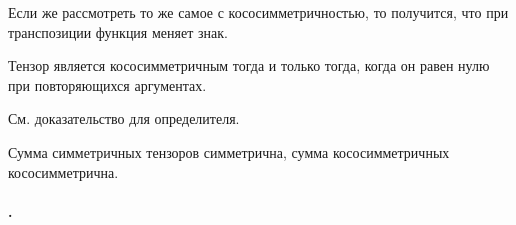 \documentclass{article}
\begin{document}
\begin{itemize}
\begin{Comment}
            Если же рассмотреть то же самое с кососимметричностью, то получится, что при транспозиции функция меняет знак.
        \end{Comment}
        \thm Тензор является кососимметричным тогда и только тогда, когда он равен нулю при повторяющихся аргументах.
        \begin{Proof}
            См. доказательство для определителя.
        \end{Proof}
        \thm Сумма симметричных тензоров симметрична, сумма кососимметричных кососимметрична.
    \end{itemize}
    \paragraph{.}
\end{document}
